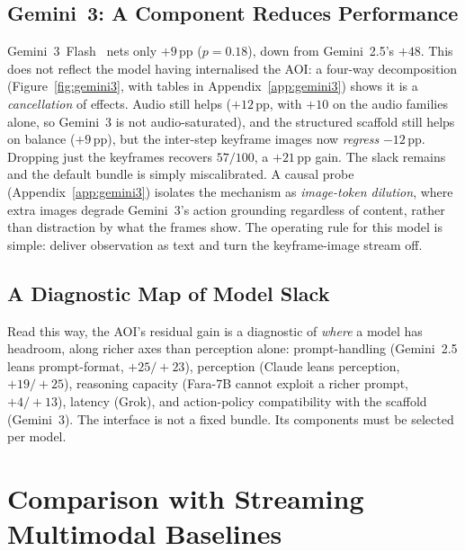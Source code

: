 \documentclass[11pt]{article}
\begin{document}
\subsection{Gemini~3: A Component Reduces Performance}
\label{sec:why_g3}

Gemini~3~Flash~\citep{gemini3flash} nets only $+9$\,pp ($p=0.18$), down from Gemini~2.5's $+48$.
This does not reflect the model having internalised the AOI: a four-way decomposition
(Figure~\ref{fig:gemini3}, with tables in Appendix~\ref{app:gemini3}) shows it is a
\emph{cancellation} of effects.
Audio still helps ($+12$\,pp, with $+10$ on the audio families alone, so Gemini~3 is
not audio-saturated), and the structured scaffold still helps on balance
($+9$\,pp), but the inter-step keyframe images now \emph{regress} $-12$\,pp.
Dropping just the keyframes recovers $57/100$, a $+21$\,pp gain. The slack remains and the default bundle is simply miscalibrated.
A causal probe (Appendix~\ref{app:gemini3}) isolates the mechanism as
\emph{image-token dilution}, where extra images degrade Gemini~3's action grounding
regardless of content, rather than distraction by what the frames show.
The operating rule for this model is simple: deliver observation as text and turn
the keyframe-image stream off.

\subsection{A Diagnostic Map of Model Slack}
\label{sec:diagmap}
Read this way, the AOI's residual gain is a diagnostic of \emph{where} a model has
headroom, along richer axes than perception alone: prompt-handling
(Gemini~2.5 leans prompt-format, $+25/+23$), perception (Claude leans perception,
$+19/+25$), reasoning capacity (Fara-7B cannot exploit a richer prompt,
$+4/+13$), latency (Grok), and action-policy compatibility with the scaffold
(Gemini~3).
The interface is not a fixed bundle. Its components must be selected per model.

\section{Comparison with Streaming Multimodal Baselines}
\label{sec:streaming}
\end{document}
